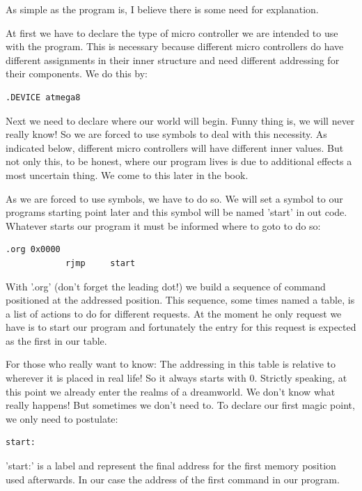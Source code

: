 As simple as the program is, I believe there is some need for explanation.

At first we have to declare the type of micro controller we are intended to use with the program. This is necessary because different micro controllers do have different assignments in their inner structure and need different addressing for their components. We do this by:

\begin{lstlisting}
.DEVICE atmega8
\end{lstlisting}

Next we need to declare where our world will begin. Funny thing is, we will never really know! So we are forced to use symbols to deal with this necessity. As indicated below, different micro controllers will have different inner values. But not only this, to be honest, where our program lives is due to additional effects a most uncertain thing. We come to this later in the book.

As we are forced to use symbols, we have to do so. We will set a symbol to our programs starting point later and this symbol will be named 'start' in out code. Whatever starts our program it must be informed where to goto to do so:

\begin{lstlisting}
.org 0x0000
            rjmp     start 
\end{lstlisting}

With '.org' (don't forget the leading dot!) we build a sequence of command positioned at the addressed position. This sequence, some times named a table, is a list of actions to do for different requests. At the moment he only request we have is to start our program and fortunately the entry for this request is expected as the first in our table.

For those who really want to know: The addressing in this table is relative to wherever it is placed in real life! So it always starts with 0. Strictly speaking, at this point we already enter the realms of a dreamworld. We don't know what really happens! But sometimes we don't need to. To declare our first magic point, we only need to postulate:

\begin{lstlisting}
start:
\end{lstlisting}

'start:'  is a label and represent the final address for the first memory position used afterwards. In our case the address of the first command in our program.

